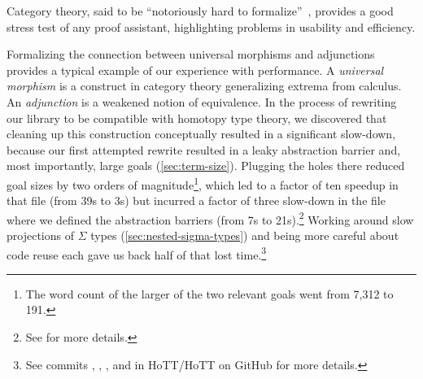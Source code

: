 Category theory, said to be ``notoriously hard to formalize''~\cite{harrison1996formalized}, provides a good stress test of any proof assistant, highlighting problems in usability and efficiency.

Formalizing the connection between universal morphisms and adjunctions provides a typical example of our experience with performance.
A \emph{universal morphism} is a construct in category theory generalizing extrema from calculus.
An \emph{adjunction} is a weakened notion of equivalence.
In the process of rewriting our library to be compatible with homotopy type theory, we discovered that cleaning up this construction conceptually resulted in a significant slow-down, because our first attempted rewrite resulted in a leaky abstraction barrier and, most importantly, large goals (\autoref{sec:term-size}).
Plugging the holes there reduced goal sizes by two orders of magnitude\footnote{The word count of the larger of the two relevant goals went from 7,312 to 191.}, which led to a factor of ten speedup in that file (from 39s to 3s) but incurred a factor of three slow-down in the file where we defined the abstraction barriers (from 7s to 21s).\footnote{%
  See  for more details.%
}
Working around slow projections of $\Sigma$ types (\autoref{sec:nested-sigma-types}) and being more careful about code reuse each gave us back half of that lost time.\footnote{%
  See commits , , , and  in HoTT/HoTT on GitHub for more details.%
}

